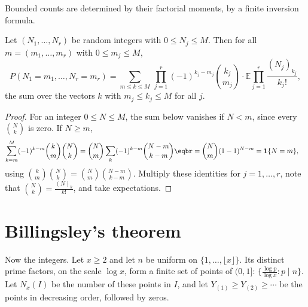 Bounded counts are determined by their factorial moments, by a finite inversion formula.

\begin{lemma}\label{lem:inversion}
Let $(N_1,\dots,N_r)$ be random integers with $0\le N_j\le M$. Then for all $m=(m_1,\dots,m_r)$ with $0\le m_j\le M$,
\[
P(N_1=m_1,\dots,N_r=m_r)=\sum_{m\le k\le M}\ \prod_{j=1}^r(-1)^{k_j-m_j}\binom{k_j}{m_j}\cdot\mathbb E\prod_{j=1}^r\frac{(N_j)_{k_j}}{k_j!},
\]
the sum over the vectors $k$ with $m_j\le k_j\le M$ for all $j$.
\end{lemma}
\begin{proof}
For an integer $0\le N\le M$, the sum below vanishes if $N<m$, since every $\binom Nk$ is zero. If $N\ge m$,
\[
\begin{aligned}\sum_{k=m}^M(-1)^{k-m}\binom km\binom Nk&=\binom Nm\sum_{k}(-1)^{k-m}\binom{N-m}{k-m}\eqbr=\binom Nm(1-1)^{N-m}=\mathbf 1\{N=m\},\end{aligned}
\]
using $\binom km\binom Nk=\binom Nm\binom{N-m}{k-m}$. Multiply these identities for $j=1,\dots,r$, note that
$\binom Nk=\frac{(N)_k}{k!}$, and take expectations.
\end{proof}

\section{Billingsley's theorem}

Now the integers. Let $x\ge2$ and let $n$ be uniform on $\{1,\dots,\lfloor x\rfloor\}$. Its distinct prime factors, on the scale $\log x$, form a finite set of points of $(0,1]$: $\{\frac{\log p}{\log x}:p\mid n\}$. Let $N_x(I)$ be the number of these points in $I$, and let $Y_{(1)}\ge Y_{(2)}\ge\cdots$
be the points in decreasing order, followed by zeros.


